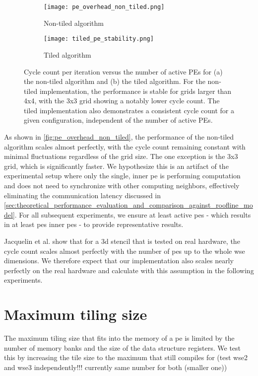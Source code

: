 \begin{figure}[h]
    \centering
    \begin{subfigure}[b]{0.48\textwidth}
        \centering
        \texttt{[image: pe\_overhead\_non\_tiled.png]}
        \caption{Non-tiled algorithm}
        \label{fig:pe_overhead_non_tiled}
    \end{subfigure}
    \hfill
    \begin{subfigure}[b]{0.48\textwidth}
        \centering
        \texttt{[image: tiled\_pe\_stability.png]}
        \caption{Tiled algorithm}
        \label{fig:tiled_pe_stability}
    \end{subfigure}
    \caption{Cycle count per iteration versus the number of active PEs for (a) the non-tiled algorithm and (b) the tiled algorithm. For the non-tiled implementation, the performance is stable for grids larger than 4x4, with the 3x3 grid showing a notably lower cycle count. The tiled implementation also demonstrates a consistent cycle count for a given configuration, independent of the number of active PEs.}
    \label{fig:pe_overhead}
\end{figure}

As shown in \autoref{fig:pe_overhead_non_tiled}, the performance of the non-tiled algorithm scales almost perfectly, with the cycle count remaining constant with minimal fluctuations regardless of the grid size. The one exception is the 3x3 grid, which is significantly faster. We hypothesize this is an artifact of the experimental setup where only the single, inner \ac{pe} is performing computation and does not need to synchronize with other computing neighbors, effectively eliminating the communication latency discussed in \autoref{sec:theoretical_performance_evaluation_and_comparison_against_roofline_model}. For all subsequent experiments, we ensure at least  active \acp{pe} - which results in at least  \acp{pe} inner \acp{pe} - to provide representative results.

Jacquelin et al. \cite{jacquelin2022massively} show that for a 3d stencil that is tested on real hardware, the cycle count scales almost perfectly with the number of \acp{pe} up to the whole \ac{wse} dimensions.
We therefore expect that our implementation also scales nearly perfectly on the real hardware and calculate with this assumption in the following experiments.

\section{Maximum tiling size}
The maximum tiling size that fits into the memory of a \ac{pe} is limited by the number of memory banks and the size of the data structure registers.
We test this by increasing the tile size to the maximum that still compiles for (test wse2 and wse3 independently!!! currently same number for both (smaller one))

